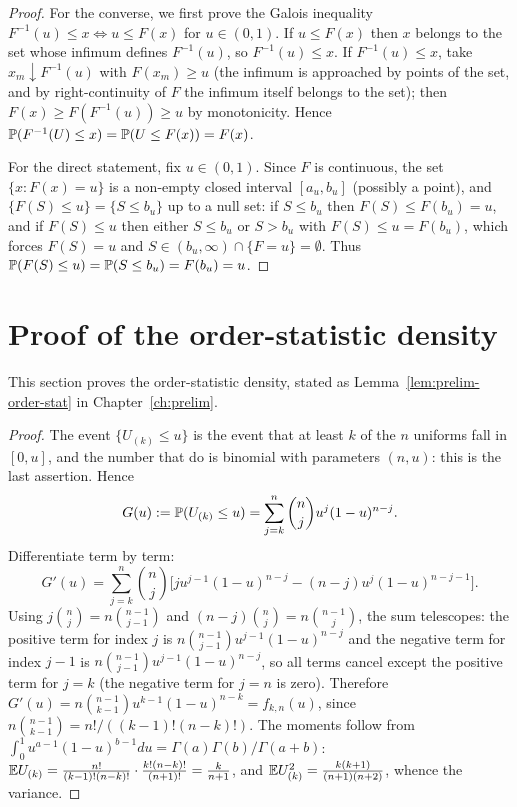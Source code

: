 \documentclass[../../main.tex]{subfiles}
\begin{document}
\begin{proof}
For the converse, we first prove the Galois inequality $F^{-1}(u)\le x\iff u\le F(x)$ for $u\in(0,1)$. If $u\le F(x)$ then $x$ belongs to the set whose infimum defines $F^{-1}(u)$, so $F^{-1}(u)\le x$. If $F^{-1}(u)\le x$, take $x_m\downarrow F^{-1}(u)$ with $F(x_m)\ge u$ (the infimum is approached by points of the set, and by right-continuity of $F$ the infimum itself belongs to the set); then $F(x)\ge F(F^{-1}(u))\ge u$ by monotonicity. Hence $\mathbb{P}(F^{-1}(U)\le x)=\mathbb{P}(U\le F(x))=F(x)$.

For the direct statement, fix $u\in(0,1)$. Since $F$ is continuous, the set $\{x:F(x)=u\}$ is a non-empty closed interval $[a_u,b_u]$ (possibly a point), and $\{F(S)\le u\}=\{S\le b_u\}$ up to a null set: if $S\le b_u$ then $F(S)\le F(b_u)=u$, and if $F(S)\le u$ then either $S\le b_u$ or $S>b_u$ with $F(S)\le u=F(b_u)$, which forces $F(S)=u$ and $S\in(b_u,\infty)\cap\{F=u\}=\emptyset$. Thus $\mathbb{P}(F(S)\le u)=\mathbb{P}(S\le b_u)=F(b_u)=u$.
\end{proof}

\section{Proof of the order-statistic density}\label{appB:orderstat}

This section proves the order-statistic density, stated as Lemma~\ref{lem:prelim-order-stat} in Chapter~\ref{ch:prelim}.

\begin{proof}
The event $\{U_{(k)}\le u\}$ is the event that at least $k$ of the $n$ uniforms fall in $[0,u]$, and the number that do is binomial with parameters $(n,u)$: this is the last assertion. Hence
\[
G(u):=\mathbb{P}(U_{(k)}\le u)=\sum_{j=k}^{n}\binom nj u^j(1-u)^{n-j}.
\]
Differentiate term by term:
\[
G'(u)=\sum_{j=k}^{n}\binom nj\big[ju^{j-1}(1-u)^{n-j}-(n-j)u^j(1-u)^{n-j-1}\big].
\]
Using $j\binom nj=n\binom{n-1}{j-1}$ and $(n-j)\binom nj=n\binom{n-1}{j}$, the sum telescopes: the positive term for index $j$ is $n\binom{n-1}{j-1}u^{j-1}(1-u)^{n-j}$ and the negative term for index $j-1$ is $n\binom{n-1}{j-1}u^{j-1}(1-u)^{n-j}$, so all terms cancel except the positive term for $j=k$ (the negative term for $j=n$ is zero). Therefore $G'(u)=n\binom{n-1}{k-1}u^{k-1}(1-u)^{n-k}=f_{k,n}(u)$, since $n\binom{n-1}{k-1}=n!/((k-1)!(n-k)!)$. The moments follow from $\int_0^1u^{a-1}(1-u)^{b-1}du=\Gamma(a)\Gamma(b)/\Gamma(a+b)$: $\mathbb{E} U_{(k)}=\frac{n!}{(k-1)!(n-k)!}\cdot\frac{k!(n-k)!}{(n+1)!}=\frac{k}{n+1}$, and $\mathbb{E} U_{(k)}^2=\frac{k(k+1)}{(n+1)(n+2)}$, whence the variance.
\end{proof}
\end{document}
